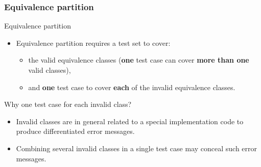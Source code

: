 \begin{frame}[hasnext=true, hasprev=true]
\frametitle{Equivalence partition}

\begin{block:fact}{Equivalence partition}
\begin{itemize}
	\item Equivalence partition requires a test set to cover:
	\begin{itemize}
		\item the valid equivalence classes (\textbf{one} test case can cover
		\textbf{more than one} valid classes),

		\item and \textbf{one} test case to cover \textbf{each} of the invalid
		equivalence classes.
	\end{itemize}
\end{itemize}
\end{block:fact}

\begin{block:fact}{Why one test case for each invalid class?}
\begin{itemize}
	\item Invalid classes are in general related to a special implementation
	code to produce differentiated error messages.

	\item Combining several invalid classes in a single test case may conceal
	such error messages.
\end{itemize}
\end{block:fact}
\end{frame}


